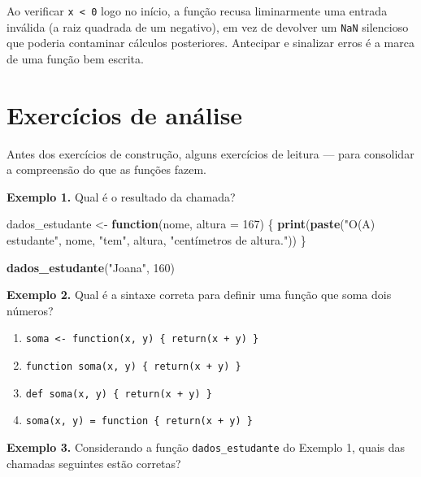 \documentclass[
  portuguese,
  11pt,
  openany]{book}
\newenvironment{Shaded}{\begin{snugshade}}{\end{snugshade}}
\newcommand{\AttributeTok}[1]{\textcolor[rgb]{0.13,0.29,0.53}{#1}}
\newcommand{\ControlFlowTok}[1]{\textcolor[rgb]{0.13,0.29,0.53}{\textbf{#1}}}
\newcommand{\DecValTok}[1]{\textcolor[rgb]{0.00,0.00,0.81}{#1}}
\newcommand{\FunctionTok}[1]{\textcolor[rgb]{0.13,0.29,0.53}{\textbf{#1}}}
\newcommand{\NormalTok}[1]{#1}
\newcommand{\OtherTok}[1]{\textcolor[rgb]{0.56,0.35,0.01}{#1}}
\newcommand{\StringTok}[1]{\textcolor[rgb]{0.31,0.60,0.02}{#1}}
\providecommand{\tightlist}{%
  \setlength{\itemsep}{0pt}\setlength{\parskip}{0pt}}
\begin{document}
Ao verificar \texttt{x\ \textless{}\ 0} logo no início, a função recusa liminarmente uma entrada
inválida (a raiz quadrada de um negativo), em vez de devolver um \texttt{NaN} silencioso
que poderia contaminar cálculos posteriores. Antecipar e sinalizar erros é a marca
de uma função bem escrita.

\section{Exercícios de análise}\label{exercuxedcios-de-anuxe1lise}

Antes dos exercícios de construção, alguns exercícios de leitura --- para
consolidar a compreensão do que as funções fazem.

\textbf{Exemplo 1.} Qual é o resultado da chamada?

\begin{Shaded}
\begin{Highlighting}[]
\NormalTok{dados\_estudante }\OtherTok{\textless{}{-}} \ControlFlowTok{function}\NormalTok{(nome, }\AttributeTok{altura =} \DecValTok{167}\NormalTok{) \{}
  \FunctionTok{print}\NormalTok{(}\FunctionTok{paste}\NormalTok{(}\StringTok{"O(A) estudante"}\NormalTok{, nome, }\StringTok{"tem"}\NormalTok{, altura, }\StringTok{"centímetros de altura."}\NormalTok{))}
\NormalTok{\}}

\FunctionTok{dados\_estudante}\NormalTok{(}\StringTok{"Joana"}\NormalTok{, }\DecValTok{160}\NormalTok{)}
\end{Highlighting}
\end{Shaded}

\textbf{Exemplo 2.} Qual é a sintaxe correta para definir uma função que soma dois
números?

\begin{enumerate}
\def\labelenumi{(\alph{enumi})}
\tightlist
\item
  \texttt{soma\ \textless{}-\ function(x,\ y)\ \{\ return(x\ +\ y)\ \}}
\item
  \texttt{function\ soma(x,\ y)\ \{\ return(x\ +\ y)\ \}}
\item
  \texttt{def\ soma(x,\ y)\ \{\ return(x\ +\ y)\ \}}
\item
  \texttt{soma(x,\ y)\ =\ function\ \{\ return(x\ +\ y)\ \}}
\end{enumerate}

\textbf{Exemplo 3.} Considerando a função \texttt{dados\_estudante} do Exemplo 1, quais das
chamadas seguintes estão corretas?
\end{document}
